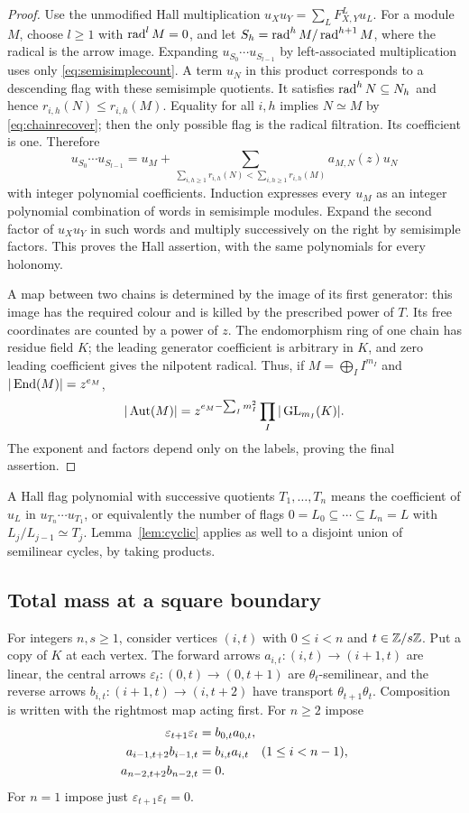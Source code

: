 \begin{proof}
Use the unmodified Hall multiplication $u_Xu_Y=\sum_LF^L_{X,Y}u_L$. For a module $M$, choose $l\ge1$ with $\operatorname{rad}^lM=0$, and let $S_h=\operatorname{rad}^hM/\operatorname{rad}^{h+1}M$, where the radical is the arrow image. Expanding $u_{S_0}\cdots u_{S_{l-1}}$ by left-associated multiplication uses only \eqref{eq:semisimplecount}. A term $u_N$ in this product corresponds to a descending flag with these semisimple quotients. It satisfies
$\operatorname{rad}^hN\subseteq N_h$ and hence $r_{i,h}(N)\le r_{i,h}(M)$. Equality for all $i,h$ implies $N\simeq M$ by \eqref{eq:chainrecover}; then the only possible flag is the radical filtration. Its coefficient is one. Therefore
\[
 u_{S_0}\cdots u_{S_{l-1}}
 =u_M+\sum_{\sum_{i,h\ge1}r_{i,h}(N)<\sum_{i,h\ge1}r_{i,h}(M)}a_{M,N}(z)u_N
\]
with integer polynomial coefficients. Induction expresses every $u_M$ as an integer polynomial combination of words in semisimple modules. Expand the second factor of $u_Xu_Y$ in such words and multiply successively on the right by semisimple factors. This proves the Hall assertion, with the same polynomials for every holonomy.

A map between two chains is determined by the image of its first generator: this image has the required colour and is killed by the prescribed power of $T$. Its free coordinates are counted by a power of $z$. The endomorphism ring of one chain has residue field $K$; the leading generator coefficient is arbitrary in $K$, and zero leading coefficient gives the nilpotent radical. Thus, if $M=\bigoplus_I I^{m_I}$ and $|\operatorname{End}(M)|=z^{e_M}$,
\[
 |\operatorname{Aut}(M)|=z^{e_M-\sum_I m_I^2}\prod_I|\operatorname{GL}_{m_I}(K)|.
\]
The exponent and factors depend only on the labels, proving the final assertion.
\end{proof}

A Hall flag polynomial with successive quotients $T_1,\ldots,T_n$ means the coefficient of $u_L$ in $u_{T_n}\cdots u_{T_1}$, or equivalently the number of flags $0=L_0\subseteq\cdots\subseteq L_n=L$ with $L_j/L_{j-1}\simeq T_j$. Lemma~\ref{lem:cyclic} applies as well to a disjoint union of semilinear cycles, by taking products.

\subsection{Total mass at a square boundary}\label{sec:square}
For integers $n,s\ge1$, consider vertices $(i,t)$ with $0\le i<n$ and $t\in\mathbb Z/s\mathbb Z$. Put a copy of $K$ at each vertex. The forward arrows
$a_{i,t}:(i,t)\to(i+1,t)$ are linear, the central arrows
$\varepsilon_t:(0,t)\to(0,t+1)$ are $\theta_t$-semilinear, and the reverse arrows
$b_{i,t}:(i+1,t)\to(i,t+2)$ have transport $\theta_{t+1}\theta_t$.
Composition is written with the rightmost map acting first. For $n\ge2$ impose
\begin{align}
 \varepsilon_{t+1}\varepsilon_t&=b_{0,t}a_{0,t},\label{eq:square}\\
 a_{i-1,t+2}b_{i-1,t}&=b_{i,t}a_{i,t}\quad(1\le i<n-1),\notag\\
 a_{n-2,t+2}b_{n-2,t}&=0.\notag
\end{align}
For $n=1$ impose just $\varepsilon_{t+1}\varepsilon_t=0$.

